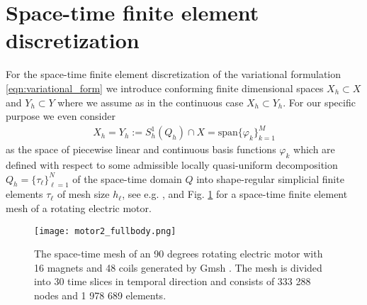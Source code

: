 \documentclass[12pt]{article}
\numberwithin{equation}{section}
\begin{document}
\section{Space-time finite element discretization}
\label{sec:space_time_fe_dis}
For the space-time finite element discretization of the variational
formulation \eqref{eqn:variational_form} we introduce conforming
finite dimensional spaces $X_h \subset X$ and $Y_h \subset Y$ where we
assume as in the continuous case $X_h \subset Y_h$. For our specific
purpose we even consider
\begin{align*}
  X_h = Y_h := S_h^1(Q_h) \cap X = \text{span}\{\varphi_k\}_{k=1}^M
\end{align*}
as the space of piecewise linear and continuous basis functions $\varphi_k$
which are defined with respect to some admissible locally quasi-uniform
decomposition $Q_h = \{\tau_\ell\}_{\ell=1}^N$ of the space-time domain $Q$
into shape-regular simplicial finite elements $\tau_\ell$ of mesh size
$h_\ell$, see e.g. \cite{NeKa19,St15}, and Fig. \ref{fig:motor_body}
for a space-time finite element mesh of a rotating electric motor.

\begin{figure}[tbhp]
\begin{center}
\begin{minipage}{0.75\linewidth}
\texttt{[image: motor2\_fullbody.png]} 
\end{minipage}
\end{center} 
\caption{The space-time mesh of an 90 degrees rotating electric motor
  with 16 magnets and 48 coils generated by Gmsh \cite{gmsh}. The mesh
  is divided into 30 time slices in temporal direction and consists
  of 333 288 nodes and 1 978 689 elements.}
\label{fig:motor_body}
\end{figure}
\end{document}
